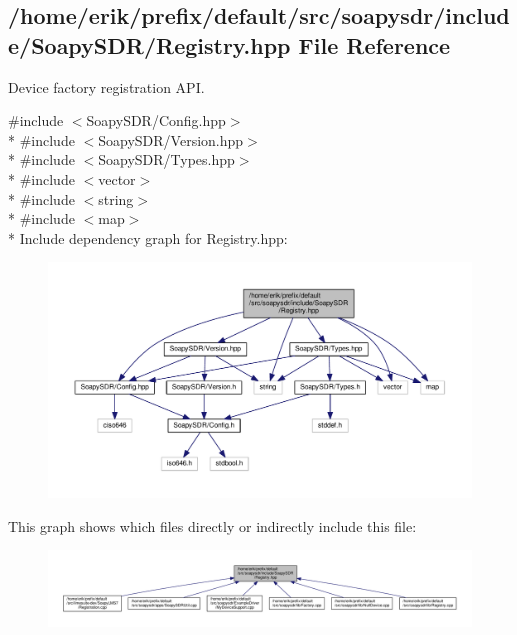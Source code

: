 \subsection{/home/erik/prefix/default/src/soapysdr/include/\+Soapy\+S\+D\+R/\+Registry.hpp File Reference}
\label{Registry_8hpp}


Device factory registration A\+PI.  


{\ttfamily \#include $<$Soapy\+S\+D\+R/\+Config.\+hpp$>$}\\*
{\ttfamily \#include $<$Soapy\+S\+D\+R/\+Version.\+hpp$>$}\\*
{\ttfamily \#include $<$Soapy\+S\+D\+R/\+Types.\+hpp$>$}\\*
{\ttfamily \#include $<$vector$>$}\\*
{\ttfamily \#include $<$string$>$}\\*
{\ttfamily \#include $<$map$>$}\\*
Include dependency graph for Registry.\+hpp\+:
\nopagebreak
\begin{figure}[H]
\begin{center}
\leavevmode
\includegraphics[width=350pt]{d3/d77/Registry_8hpp__incl}
\end{center}
\end{figure}
This graph shows which files directly or indirectly include this file\+:
\nopagebreak
\begin{figure}[H]
\begin{center}
\leavevmode
\includegraphics[width=350pt]{d2/d8a/Registry_8hpp__dep__incl}
\end{center}
\end{figure}
